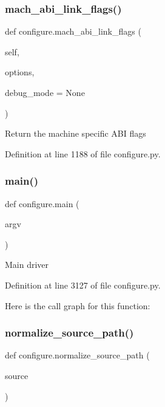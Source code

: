\subsubsection{\texorpdfstring{mach\+\_\+abi\+\_\+link\+\_\+flags()}{mach\_abi\_link\_flags()}}
{\footnotesize\ttfamily def configure.\+mach\+\_\+abi\+\_\+link\+\_\+flags (\begin{DoxyParamCaption}\item[{}]{self,  }\item[{}]{options,  }\item[{}]{debug\+\_\+mode = {\ttfamily None} }\end{DoxyParamCaption})}

\begin{DoxyVerb}Return the machine specific ABI flags
\end{DoxyVerb}
 

Definition at line 1188 of file configure.\+py.

\mbox{\label{namespaceconfigure_ab36af005492375c1144a850d45fb1a42}} 
\subsubsection{\texorpdfstring{main()}{main()}}
{\footnotesize\ttfamily def configure.\+main (\begin{DoxyParamCaption}\item[{}]{argv }\end{DoxyParamCaption})}

\begin{DoxyVerb}Main driver
\end{DoxyVerb}
 

Definition at line 3127 of file configure.\+py.

Here is the call graph for this function\+:
\mbox{\label{namespaceconfigure_a60af6ffd74cbefc9b8125d9e0d94f003}} 
\subsubsection{\texorpdfstring{normalize\+\_\+source\+\_\+path()}{normalize\_source\_path()}}
{\footnotesize\ttfamily def configure.\+normalize\+\_\+source\+\_\+path (\begin{DoxyParamCaption}\item[{}]{source }\end{DoxyParamCaption})}

